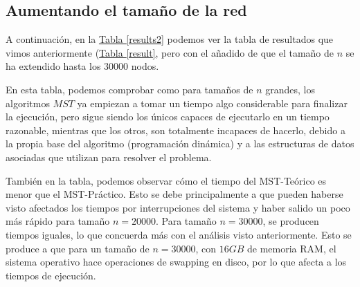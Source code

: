 \documentclass[paper=a4, fontsize=11pt]{article} %
\numberwithin{equation}{section} %
\numberwithin{figure}{section} %
\numberwithin{table}{section} %
\begin{document}
\subsection{Aumentando el tamaño de la red}

A continuación, en la \hyperref[results2]{Tabla \ref*{results2}} podemos ver la tabla de resultados que vimos anteriormente (\hyperref[result]{Tabla \ref*{result}}, pero con el añadido de que el tamaño de $n$ se ha extendido hasta los 30000 nodos.



En esta tabla, podemos comprobar como para tamaños de $n$ grandes, los algoritmos $MST$ ya empiezan a tomar un tiempo algo considerable para finalizar la ejecución, pero sigue siendo los únicos capaces de ejecutarlo en un tiempo razonable, mientras que los otros, son totalmente incapaces de hacerlo, debido a la propia base del algoritmo (programación dinámica) y a las estructuras de datos asociadas que utilizan para resolver el problema.

También en la tabla, podemos observar cómo el tiempo del MST-Teórico es menor que el MST-Práctico. Esto se debe principalmente a que pueden haberse visto afectados los tiempos por interrupciones del sistema y haber salido un poco más rápido para tamaño $n=20000$. Para tamaño $n=30000$, se producen tiempos iguales, lo que concuerda más con el análisis visto anteriormente. Esto se produce a que para un tamaño de $n=30000$, con $16GB$ de memoria RAM, el sistema operativo hace operaciones de swapping en disco, por lo que afecta a los tiempos de ejecución.

\end{document}
